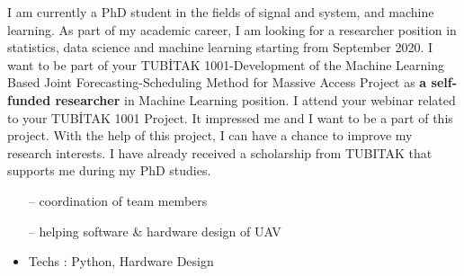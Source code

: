 \documentclass[10pt,a4paper,ragged2e,withhyper]{altacv}
\begin{document}
\begin{paracol}{1}
I am currently a PhD student in the fields of signal and system, and machine learning. As part of my academic career, I am looking for a researcher position in statistics, data science and machine learning starting from September 2020. I want to be part of your TUBİTAK 1001-Development of the Machine Learning Based Joint Forecasting-Scheduling Method for Massive Access Project as \textbf{a self-funded researcher} in Machine Learning position. I attend your webinar related to your TUBİTAK 1001 Project. It impressed me and I want to be a part of this project. With the help of this project, I can have a chance to improve  my research interests. I have already received a scholarship from TUBITAK that supports me during my PhD studies.


\medskip
\medskip

\begin{itemize}
    \setlength{\itemindent}{0.5em}
    \item[--]   \small {coordination of team members}
    \item[--]   \small {helping software \& hardware design of UAV}
    \item Techs : Python, Hardware Design
\end{itemize}


\end{paracol}
\end{document}
